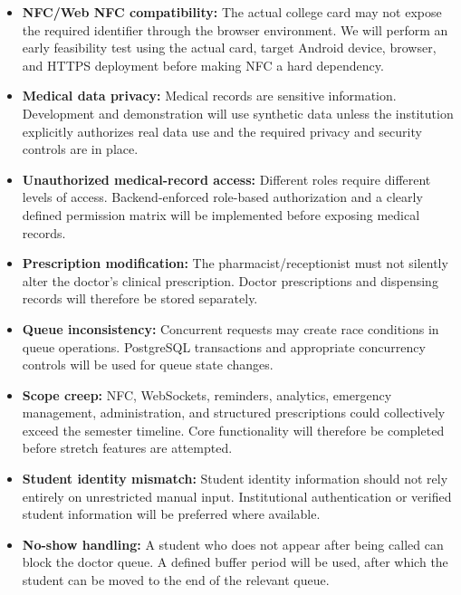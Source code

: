 \documentclass[11pt,a4paper]{article}
\begin{document}
\begin{itemize}

    \item \textbf{NFC/Web NFC compatibility:} The actual college card may not expose the required identifier through the browser environment. We will perform an early feasibility test using the actual card, target Android device, browser, and HTTPS deployment before making NFC a hard dependency.

    \item \textbf{Medical data privacy:} Medical records are sensitive information. Development and demonstration will use synthetic data unless the institution explicitly authorizes real data use and the required privacy and security controls are in place.

    \item \textbf{Unauthorized medical-record access:} Different roles require different levels of access. Backend-enforced role-based authorization and a clearly defined permission matrix will be implemented before exposing medical records.

    \item \textbf{Prescription modification:} The pharmacist/receptionist must not silently alter the doctor's clinical prescription. Doctor prescriptions and dispensing records will therefore be stored separately.

    \item \textbf{Queue inconsistency:} Concurrent requests may create race conditions in queue operations. PostgreSQL transactions and appropriate concurrency controls will be used for queue state changes.

    \item \textbf{Scope creep:} NFC, WebSockets, reminders, analytics, emergency management, administration, and structured prescriptions could collectively exceed the semester timeline. Core functionality will therefore be completed before stretch features are attempted.

    \item \textbf{Student identity mismatch:} Student identity information should not rely entirely on unrestricted manual input. Institutional authentication or verified student information will be preferred where available.

    \item \textbf{No-show handling:} A student who does not appear after being called can block the doctor queue. A defined buffer period will be used, after which the student can be moved to the end of the relevant queue.


\end{itemize}
\end{document}
